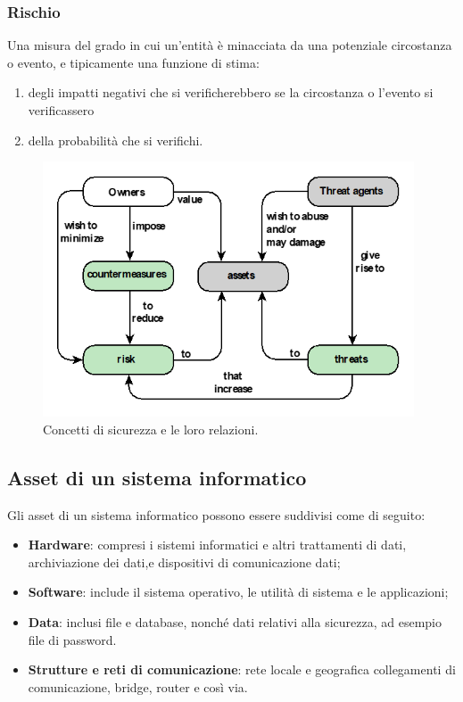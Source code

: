 \subsubsection{Rischio}
Una misura del grado in cui un'entità è minacciata da una potenziale circostanza o evento, e tipicamente una funzione di stima:
\begin{enumerate}
    \item  degli impatti negativi che si verificherebbero se la circostanza o l'evento si verificassero
    \item  della probabilità che si verifichi.
\end{enumerate}

\begin{figure}[H]
	\centering
    \includegraphics[width=11cm, keepaspectratio]{bistarelli/img/cap_1/relazione_concetti_sicurezza.png}
	\caption{Concetti di sicurezza e le loro relazioni.}\label{fig:relazioni_concetti_sec}
\end{figure}

\subsection{Asset di un sistema informatico}
Gli asset di un sistema informatico possono essere suddivisi come di seguito:
\begin{itemize}
    \item \textbf{Hardware}: compresi i sistemi informatici e altri trattamenti di dati, archiviazione dei dati,e dispositivi di comunicazione dati;
    \item \textbf{Software}: include il sistema operativo, le utilità di sistema e le applicazioni;
    \item \textbf{Data}: inclusi file e database, nonché dati relativi alla sicurezza, ad esempio file di password. 
    \item \textbf{Strutture e reti di comunicazione}: rete locale e geografica collegamenti di comunicazione, bridge, router e così via.
\end{itemize}

